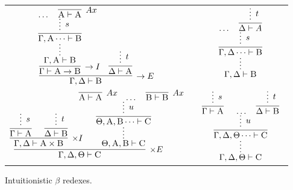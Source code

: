 \begin{figure}
	\centering
	\begin{tabularx}{0.9\textwidth}{@{}c@{~}c@{~}c@{}}
	$\infer[\to E]{\Gamma, \Delta \vdash \prop{B}}{
	\infer[\to I]{\Gamma \vdash \prop{A} \to \prop{B}}{
		\infer*[]{\Gamma, \prop{A} \vdash \prop{B}}{
			\infer[]{\Gamma, \prop{A} \dots \vdash \prop{B}}{
					\infer*[s]{}{\dots & \infer[Ax]{\prop{A} \vdash \prop{A}}{}}
				}
			}
		}
		&
		\infer{\Delta \vdash \prop{A}}{
			\infer*[t]{}{}
		}
	}$
	&
	\raisebox{20pt}{$\implies$}
	&
	$ 
	\infer*[]{\Gamma, \Delta \vdash \prop{B}}{
		\infer[]{\Gamma, \Delta \dots \vdash \prop{B}}{
			\infer*[s]{}{
			\dots &
			\infer[]{\Delta \vdash A}{
				\infer*[t]{}{}
			}}
		}
	}
	$\\[\smallsep]
	$
	\infer[\times E]{\Gamma, \Delta, \Theta \vdash \prop{C}}{
		\infer[\times I]{\Gamma, \Delta \vdash \prop{A} \times \prop{B}}{
			\infer[]{\Gamma \vdash \prop{A}}{\infer*[s]{}{}}
			&
			\infer[]{\Delta \vdash \prop{B}}{\infer*[t]{}{}}
		}		
		&
		\hspace{-15pt}
		\infer*[]{\Theta, \prop{A}, \prop{B} \vdash \prop{C}}{
			\infer[]{\Theta, \prop{A}, \prop{B}\dots \vdash \prop{C}}{
				\infer*[u]{}{
					\infer[Ax]{\prop{A} \vdash \prop{A}}{
					}
					&
					\dots
					&
					\infer[Ax]{\prop{B} \vdash \prop{B}}{}
				}
			}
		}
	}
	$
	&
	\raisebox{20pt}{$\implies$}
	&
	$
	\infer*[]{\Gamma, \Delta, \Theta \vdash \prop{C}}{
		\infer[]{\Gamma, \Delta, \Theta \dots \vdash \prop{C}}{
			\infer*[u]{}{
				\infer[]{\Gamma \vdash \prop{A}}{
					\infer*[s]{}{}
				}
				&
				\dots 
				&
				\infer[]{\Delta \vdash \prop{B}}{
					\infer*[t]{}{}
				}
			}
		}
	} 
	$
	\end{tabularx}	\caption{Intuitionistic $\beta$ redexes.}
	\label{figure:intuitionistic_proof_reduction}
\end{figure}


